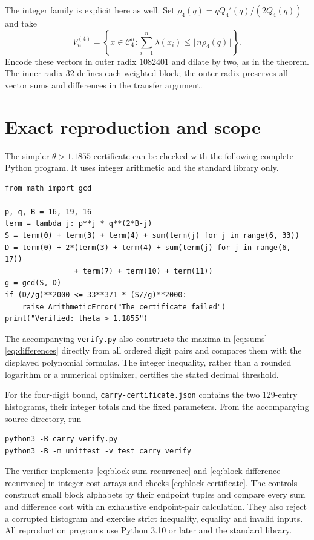 \documentclass[11pt,a4paper]{article}
\begin{document}
The integer family is explicit here as well. Set
$\rho_4(q)=qQ_4'(q)/(2Q_4(q))$ and take
\[
 V_n^{(4)}=\left\{x\in\mathcal C_4^n:
             \sum_{i=1}^n\lambda(x_i)\le\lfloor n\rho_4(q)\rfloor\right\}.
\]
Encode these vectors in outer radix $1082401$ and dilate by two, as in
the theorem. The inner radix $32$ defines each weighted block; the outer
radix preserves all vector sums and differences in the transfer argument.

\section{Exact reproduction and scope}
The simpler $\theta>1.1855$ certificate can be checked with the following
complete Python program. It uses integer arithmetic and the standard
library only.
\begin{verbatim}
from math import gcd

p, q, B = 16, 19, 16
term = lambda j: p**j * q**(2*B-j)
S = term(0) + term(3) + term(4) + sum(term(j) for j in range(6, 33))
D = term(0) + 2*(term(3) + term(4) + sum(term(j) for j in range(6, 17))
                + term(7) + term(10) + term(11))
g = gcd(S, D)
if (D//g)**2000 <= 33**371 * (S//g)**2000:
    raise ArithmeticError("The certificate failed")
print("Verified: theta > 1.1855")
\end{verbatim}
The accompanying \texttt{verify.py} also constructs the maxima in
\eqref{eq:sums}--\eqref{eq:differences} directly from all ordered digit
pairs and compares them with the displayed polynomial formulas. The integer inequality,
rather than a rounded logarithm or a numerical optimizer, certifies the
stated decimal threshold.

For the four-digit bound, \texttt{carry-certificate.json} contains the
two 129-entry histograms, their integer totals and the fixed parameters.
From the accompanying source directory, run
\begin{verbatim}
python3 -B carry_verify.py
python3 -B -m unittest -v test_carry_verify
\end{verbatim}
The verifier implements~\eqref{eq:block-sum-recurrence} and
\eqref{eq:block-difference-recurrence} in integer cost arrays and checks
\eqref{eq:block-certificate}. The controls construct small block alphabets
by their endpoint tuples and compare every sum and difference cost with
an exhaustive endpoint-pair calculation. They also reject a corrupted
histogram and exercise strict inequality, equality and invalid inputs.
All reproduction programs use Python 3.10 or later and the standard library.
\end{document}
